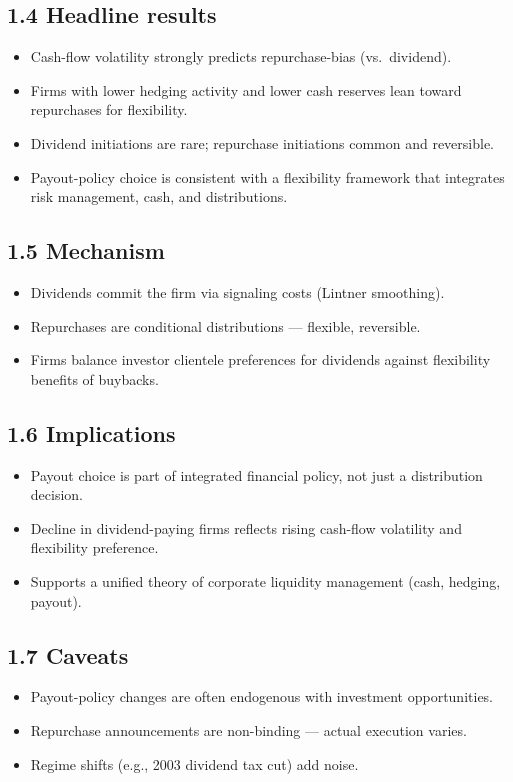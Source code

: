 \documentclass[11pt]{article}
\begin{document}
\subsection*{1.4 Headline results}
\begin{itemize}
\item Cash-flow volatility strongly predicts repurchase-bias (vs.\ dividend).
\item Firms with lower hedging activity and lower cash reserves lean toward repurchases for flexibility.
\item Dividend initiations are rare; repurchase initiations common and reversible.
\item Payout-policy choice is consistent with a flexibility framework that integrates risk management, cash, and distributions.
\end{itemize}

\subsection*{1.5 Mechanism}
\begin{itemize}
\item Dividends commit the firm via signaling costs (Lintner smoothing).
\item Repurchases are conditional distributions --- flexible, reversible.
\item Firms balance investor clientele preferences for dividends against flexibility benefits of buybacks.
\end{itemize}

\subsection*{1.6 Implications}
\begin{itemize}
\item Payout choice is part of integrated financial policy, not just a distribution decision.
\item Decline in dividend-paying firms reflects rising cash-flow volatility and flexibility preference.
\item Supports a unified theory of corporate liquidity management (cash, hedging, payout).
\end{itemize}

\subsection*{1.7 Caveats}
\begin{alertbox}
\begin{itemize}
\item Payout-policy changes are often endogenous with investment opportunities.
\item Repurchase announcements are non-binding --- actual execution varies.
\item Regime shifts (e.g., 2003 dividend tax cut) add noise.
\end{itemize}
\end{alertbox}
\end{document}
